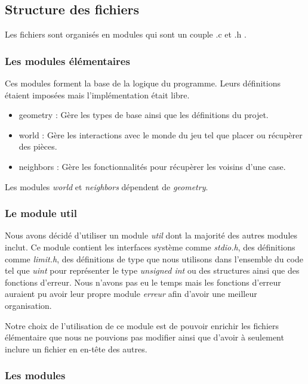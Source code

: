 \subsection{Structure des fichiers}

Les fichiers sont organisés en modules qui sont un couple .c et .h .  

\subsubsection{Les modules élémentaires}

Ces modules forment la base de la logique du programme.
Leurs définitions étaient imposées mais l'implémentation était libre. 

\begin{itemize}
    \item geometry : Gère les types de base ainsi que les définitions du projet.
    \item world : Gère les interactions avec le monde du jeu tel que placer ou récupèrer des pièces.
    \item neighbors : Gère les fonctionnalités pour récupèrer les voisins d'une case.
\end{itemize}

Les modules \emph{world} et \emph{neighbors} dépendent de \emph{geometry}.


\subsubsection{Le module util}
\label{ssec:module-util}
Nous avons décidé d'utiliser un module \emph{util} dont la majorité des autres modules inclut. 
Ce module contient les interfaces système comme \emph{stdio.h}, des définitions comme \emph{limit.h},
des définitions de type que nous utilisons dans l'ensemble du code tel que \emph{uint} pour représenter
le type \emph{unsigned int} ou des structures ainsi que des fonctions d'erreur. Nous n'avons pas eu le temps
mais les fonctions d'erreur auraient pu avoir leur propre module \emph{erreur} afin d'avoir une meilleur organisation.

Notre choix de l'utilisation de ce module est de pouvoir enrichir les fichiers élémentaire que nous ne pouvions pas 
modifier ainsi que d'avoir à seulement inclure un fichier en en-tête des autres.  


\subsubsection{Les modules}

